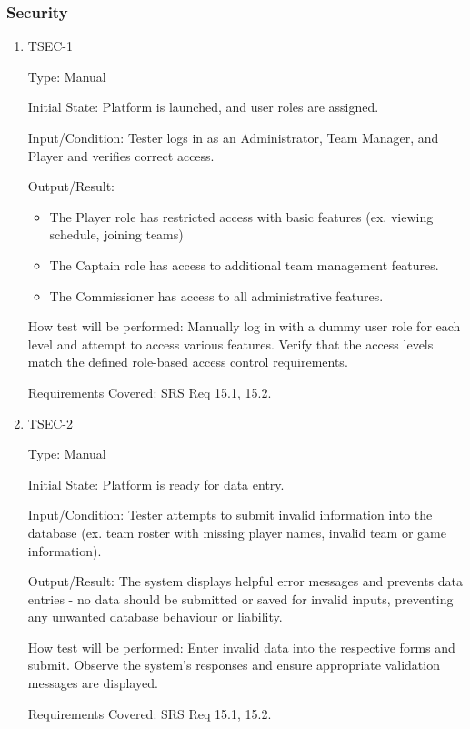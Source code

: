 \documentclass[12pt, titlepage]{article}
\begin{document}
\subsubsection{Security}

\begin{enumerate}

\item{TSEC-1\\}

Type: Manual

Initial State: Platform is launched, and user roles are assigned.

Input/Condition: Tester logs in as an Administrator, Team Manager, and Player and verifies correct access.

Output/Result:

\begin{itemize}
\item{The Player role has restricted access with basic features (ex. viewing schedule, joining teams)}
\item{The Captain role has access to additional team management features.}
\item{The Commissioner has access to all administrative features.}

\end{itemize} 

How test will be performed: Manually log in with a dummy user role for each level and attempt to access various features. Verify that the access levels match the defined role-based access control requirements.

Requirements Covered: SRS Req 15.1, 15.2.

\item{TSEC-2\\}

Type: Manual

Initial State: Platform is ready for data entry.

Input/Condition: Tester attempts to submit invalid information into the database (ex. team roster with missing player names, invalid team or game information).

Output/Result: The system displays helpful error messages and prevents data entries - no data should be submitted or saved for invalid inputs, preventing any unwanted database behaviour or liability.

How test will be performed: Enter invalid data into the respective forms and submit. Observe the system's responses and ensure appropriate validation messages are displayed.

Requirements Covered: SRS Req 15.1, 15.2.

\end{enumerate}
\end{document}
